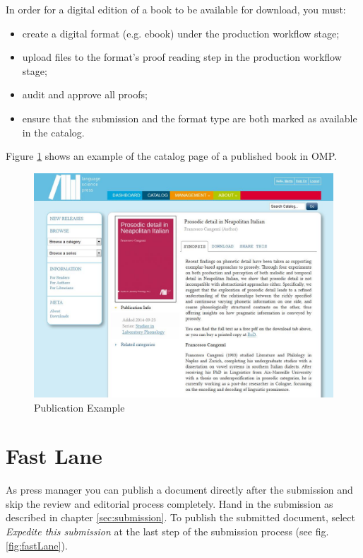 In order for a digital edition of a book to be available for download, you must:
\begin{itemize}[noitemsep]
\item create a digital format (e.g. ebook) under the production workflow stage;
\item upload files to the format's proof reading step in the production workflow stage;
\item audit and approve all proofs;
\item ensure that the submission and the format type are both marked as available in the catalog.
\end{itemize}


Figure \ref{fig:publication} shows an example of the catalog page of a published book in OMP.

\begin{figure}[h] \centering
\includegraphics[width=1\textwidth]{./img/publication.jpg} \caption{Publication Example}
\label{fig:publication}
\end{figure}

\newpage
\section{Fast Lane}
As press manager you can publish a document directly after the submission and skip the review and editorial process completely. Hand in the submission as described in chapter \ref{sec:submission}. To publish the submitted document, select \textit{Expedite this submission} at the last step of the submission process (see fig. \ref{fig:fastLane}).

